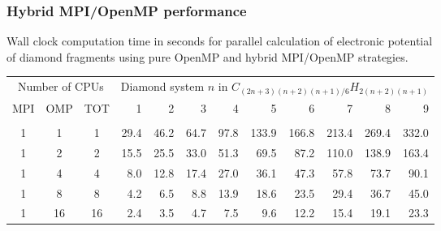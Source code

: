 \documentclass[mathserif, 8pt]{beamer}
\begin{document}
\begin{frame}
    \frametitle{Hybrid MPI/OpenMP performance}
    \centering
    Wall clock computation time in seconds for parallel calculation of electronic potential\\
    of diamond fragments using pure OpenMP and hybrid MPI/OpenMP strategies.\\
    \begin{table}
    \tiny
    \begin{tabular}{cccrrrrrrrrr}
	\hline
	\hline                                                                           
	\multicolumn{3}{c}{Number of CPUs}&
	\multicolumn{9}{c}{Diamond system $n$ in $C_{(2n+3)(n+2)(n+1)/6}H_{2(n+2)(n+1)}$}\\
	MPI&OMP&TOT	&1	&2	&3	&4	&5	&6	&7	&8	&9	\\
	\hline
	   &   &   	&	&      	&	&	&	&	&	&	&	\\
	  1&  1&  1	& 29.4	& 46.2 	& 64.7 	& 97.8  &133.9  &166.8  &213.4  &269.4  &332.0  \\
	  1&  2&  2	& 15.5	& 25.5 	& 33.0 	& 51.3  & 69.5  & 87.2  &110.0  &138.9  &163.4  \\
	  1&  4&  4	&  8.0 	& 12.8 	& 17.4 	& 27.0  & 36.1  & 47.3  & 57.8  & 73.7  & 90.1  \\
	  1&  8&  8	&  4.2 	&  6.5 	&  8.8 	& 13.9  & 18.6  & 23.5  & 29.4  & 36.7  & 45.0  \\
	  1& 16& 16	&  2.4 	&  3.5 	&  4.7 	&  7.5  &  9.6  & 12.2  & 15.4  & 19.1  & 23.3  \\

\end{tabular}
\end{table}
\end{frame}
\end{document}
